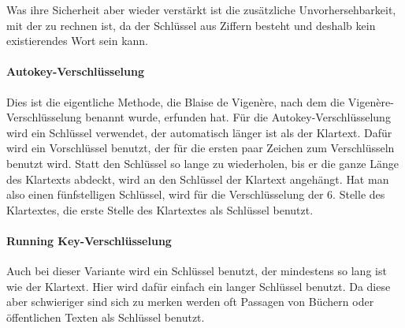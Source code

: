 Was ihre Sicherheit aber wieder verstärkt ist die zusätzliche Unvorhersehbarkeit, mit der zu rechnen ist, da der Schlüssel aus Ziffern besteht und deshalb kein existierendes Wort sein kann.


\paragraph{Autokey-Verschlüsselung}
\label{sec:v-autokey}
Dies ist die eigentliche Methode, die Blaise de Vigenère, nach dem die Vigenère-Verschlüsselung benannt wurde, erfunden hat. Für die Autokey-Verschlüsselung wird ein Schlüssel verwendet, der automatisch länger ist als der Klartext. Dafür wird ein Vorschlüssel benutzt, der für die ersten paar Zeichen zum Verschlüsseln benutzt wird. Statt den Schlüssel so lange zu wiederholen, bis er die ganze Länge des Klartexts abdeckt, wird an den Schlüssel der Klartext angehängt. \cite{kryptografie:autokey} Hat man also einen fünfstelligen Schlüssel, wird für die Verschlüsselung der 6. Stelle des Klartextes, die erste Stelle des Klartextes als Schlüssel benutzt.


\paragraph{Running Key-Verschlüsselung}
\label{sec:v-running-key}
Auch bei dieser Variante wird ein Schlüssel benutzt, der mindestens so lang ist wie der Klartext. Hier wird dafür einfach ein langer Schlüssel benutzt. Da diese aber schwieriger sind sich zu merken werden oft Passagen von Büchern oder öffentlichen Texten als Schlüssel benutzt.  \cite{wikipedia:running_key}





